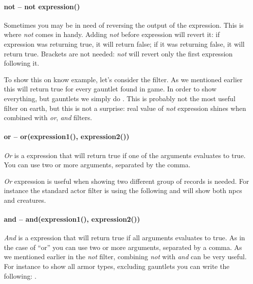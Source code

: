 \paragraph{not -- not expression()}
Sometimes you may be in need of reversing the output of the expression. This is where \textit{not} comes in handy. Adding \textit{not} before
expression will revert it: if expression was returning true, it will return false; if it was returning false, it will return true. Brackets
are not needed: \textit{not} will revert only the first expression following it.

To show this on know example, let's consider the  filter. As we mentioned earlier this will return true
for every gauntlet found in game. In order to show everything, but gauntlets we simply do .
This is probably not the most useful filter on earth, but this is not a surprise: real value of \textit{not} expression shines when combined with
\textit{or}, \textit{and} filters.

\paragraph{or -- or(expression1(), expression2())}
\textit{Or} is a expression that will return true if one of the arguments evaluates to true. You can use two or more arguments, separated by the comma.

\textit{Or} expression is useful when showing two different group of records is needed. For instance the standard actor filter is using the following
 and will show both npcs and creatures.

\paragraph{and -- and(expression1(), expression2())}
\textit{And} is a expression that will return true if all arguments evaluates to true. As in the case of ``or'' you can use two or more arguments,
separated by a comma.
As we mentioned earlier in the \textit{not} filter, combining \textit{not} with \textit{and} can be very useful. For instance to show all armor types,
excluding gauntlets you can write the following: .

